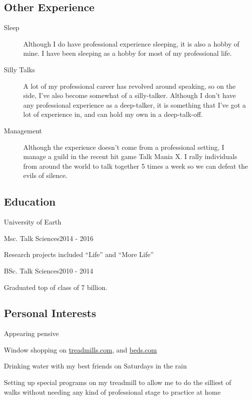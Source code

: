 \documentclass[pdftex,letterpaper,10pt]{article}
\begin{document}
\subsection*{Other Experience}
\begin{description}
    \item[Sleep] Although I do have professional experience sleeping, it is also a hobby of mine.
        I have been sleeping as a hobby for most of my professional life.
    \item[Silly Talks] A lot of my professional career has revolved around speaking, so on the side, I've also become somewhat of a silly-talker.
        Although I don't have any professional experience as a deep-talker, it is something that I've got a lot of experience in, and can hold my own in a deep-talk-off.
    \item[Management] Although the experience doesn't come from a professional setting, I manage a guild in the recent hit game Talk Mania X.
        I rally individuals from around the world to talk together 5 times a week so we can defeat the evils of silence.
\end{description}
%
\subsection*{Education}
\begin{school}{University of Earth}
    \begin{degree}{Msc. Talk Sciences}{2014 - 2016}
        \item Research projects included ``Life'' and ``More Life''
    \end{degree}
    \begin{degree}{BSc. Talk Sciences}{2010 - 2014}
        \item Graduated top of class of 7 billion.
    \end{degree}
\end{school}
%
\subsection*{Personal Interests}
%
\begin{itemize*}[itemjoin=\hspace{8pt},label={\(\bullet\)\hspace{2pt}}]
    \item Appearing pensive
    \item Window shopping on \href{http://treadmills.com}{treadmills.com}, and \href{http://beds.com}{beds.com}
    \item Drinking water with my best friends on Saturdays in the rain
    \item Setting up special programs on my treadmill to allow me to do the silliest of walks without needing any kind of professional stage to practice at home
\end{itemize*}
%
\end{document}
